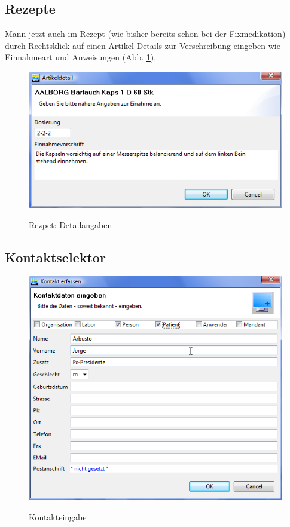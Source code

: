 \documentclass[a4paper]{scrartcl}
\begin{document}
\subsection{Rezepte}
Mann jetzt auch im Rezept (wie bisher bereits schon bei der Fixmedikation) durch Rechtsklick auf einen Artikel Details zur Verschreibung eingeben wie Einnahmeart und Anweisungen (Abb. \ref{fig:einnahme1}).
\begin{figure}
  \includegraphics{einnahme1}\\
  \caption{Rezpet: Detailangaben}\label{fig:einnahme1}
\end{figure}

\subsection{Kontaktselektor}
\begin{figure}
  \includegraphics{kontakt}\\
  \caption{Kontakteingabe}\label{fig:kontakt}
\end{figure}
\end{document}
